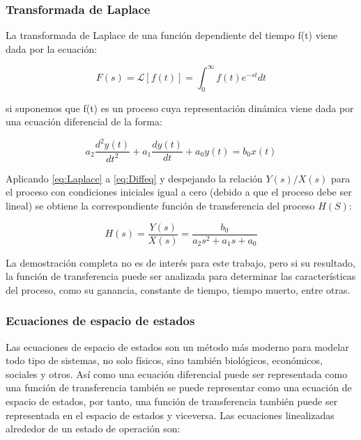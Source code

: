 		\subsubsection{Transformada de Laplace}
		
			La transformada de Laplace de una función dependiente del tiempo f(t) viene dada por la ecuación:
			
			\begin{equation}\label{eq:Laplace}
				F(s) = \mathcal{L}\left[f(t) \right] = \int_{0}^{\infty} f(t)e^{-st}dt
			\end{equation}
			
			\noindent si suponemos que f(t) es un proceso cuya representación dinámica viene dada por una ecuación diferencial de la forma:
			
			\begin{equation}\label{eq:Diffeq}
				a_{2}\frac{d^{2}y(t)}{dt^{2}} + a_{1}\frac{dy(t)}{dt} + a_{0}y(t) = b_{0}x(t)
			\end{equation}
			
			Aplicando \cref{eq:Laplace} a \cref{eq:Diffeq}  y despejando la relación $Y(s)/X(s)$ para el proceso con condiciones iniciales igual a cero (debido a que el proceso debe ser lineal) se obtiene la correspondiente función de transferencia del proceso $H(S)$:
			
			 \begin{equation}\label{eq:TransferFunction}
			 	H(s) =	\frac{Y(s)}{X(s)} = \frac{b_{0}}{a_{2}s^{2} + a_{1}s + a_{0}}
			 \end{equation}
			 
			 La demostración completa \Parencite[pp.$\,$21-22]{smith1985principles} no es de interés para este trabajo, pero si su resultado, la función de transferencia puede ser analizada para determinar las características del proceso, como su ganancia, constante de tiempo, tiempo muerto, entre otras.
			 
		 \subsubsection{Ecuaciones de espacio de estados}
		 
		 	Las ecuaciones de espacio de estados son un método más moderno para modelar todo tipo de sistemas, no solo físicos, sino también biológicos, económicos, sociales y otros. Así como una ecuación diferencial puede ser representada como una función de transferencia también se puede representar como una ecuación de espacio de estados, por tanto, una función de transferencia también puede ser representada en el espacio de estados y viceversa. Las ecuaciones linealizadas alrededor de un estado de operación \Parencite[p.$\,$31]{ogata2003ingenieria} son:
		 

